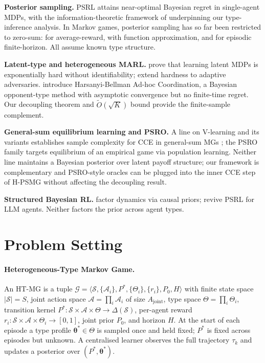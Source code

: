 ﻿\documentclass{article}
\begin{document}
\textbf{Posterior sampling.} PSRL \citep{strens2000bayesian,osband2013more,agrawal2017optimistic,ouyang2017learning} attains near-optimal Bayesian regret in single-agent MDPs, with the information-theoretic framework of \citet{russo2014learning,russo2016information} underpinning our type-inference analysis. In Markov games, posterior sampling has so far been restricted to zero-sum: \citet{jafarnia2021learning} for average-reward, \citet{xiong2022self} with function approximation, and \citet{yueh2026bayesian} for episodic finite-horizon. All assume known type structure.

\textbf{Latent-type and heterogeneous MARL.} \citet{kwon2021rl} prove that learning latent MDPs is exponentially hard without identifiability; \citet{tian2024learning} extend hardness to adaptive adversaries. \citet{albrecht2013game,albrecht2019convergence} introduce Harsanyi-Bellman Ad-hoc Coordination, a Bayesian opponent-type method with asymptotic convergence but no finite-time regret. Our decoupling theorem and $\tilde O(\sqrt K)$ bound provide the finite-sample complement.

\textbf{General-sum equilibrium learning and PSRO.} A line on V-learning and its variants establishes sample complexity for CCE in general-sum MGs \citep{jin2021v,song2022when,mao2023decentralized,erez2023regret,cui2025incentivize}; the PSRO family \citep{lanctot2017unified,muller2019generalized,mcaleer2020pipeline,marris2021multi,mcaleer2021xdo,mcaleer2022anytime,dinh2022online,zhou2022efficient,yao2023policy} targets equilibrium of an empirical game via population learning. Neither line maintains a Bayesian posterior over latent payoff structure; our framework is complementary and PSRO-style oracles can be plugged into the inner CCE step of H-PSMG without affecting the decoupling result.

\textbf{Structured Bayesian RL.} \citet{mutti2024exploiting} factor dynamics via causal priors; \citet{arumugam2026toward} revive PSRL for LLM agents. Neither factors the prior across agent types.

\section{Problem Setting}
\label{sec:setting}

\paragraph{Heterogeneous-Type Markov Game.}
An HT-MG is a tuple
$\mathcal{G} = \langle \mathcal{S}, \{\mathcal{A}_i\}, P^*, \{\Theta_i\}, \{r_i\}, P_0, H \rangle$
with finite state space $|\mathcal S|=S$, joint action space $\mathcal A=\prod_i \mathcal A_i$ of size $A_{\mathrm{joint}}$, type space $\Theta=\prod_i \Theta_i$, transition kernel $P^*\!:\!\mathcal S\!\times\!\mathcal A\!\times\!\Theta\to\Delta(\mathcal S)$, per-agent reward $r_i\!:\!\mathcal S\!\times\!\mathcal A\!\times\!\Theta_i\!\to\![0,1]$, joint prior $P_0$, and horizon $H$. At the start of each episode a type profile $\boldsymbol\theta^* \in \Theta$ is sampled once and held fixed; $P^*$ is fixed across episodes but unknown. A centralised learner observes the full trajectory $\tau_k$ and updates a posterior over $(P^*, \boldsymbol\theta^*)$.
\end{document}
